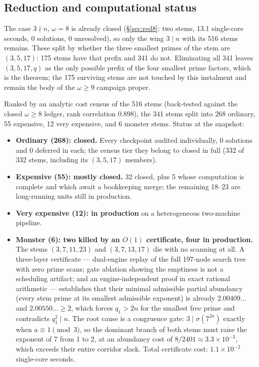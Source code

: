 \documentclass[11pt]{article}
\theoremstyle{remark}
\begin{document}
\subsection{Reduction and computational status}\label{sec:255status}

The case $3 \nmid n$, $\omega = 8$ is already closed (\S\ref{sec:red8}: two stems, 13.1 single-core seconds, 0 solutions, 0 unresolved), so only the wing $3 \mid n$ with its 516 stems remains. These split by whether the three smallest primes of the stem are $(3, 5, 17)$: 175 stems have that prefix and 341 do not. Eliminating all 341 leaves $(3, 5, 17, q)$ as the only possible prefix of the four smallest prime factors, which is the theorem; the 175 surviving stems are not touched by this instalment and remain the body of the $\omega \ge 9$ campaign proper.

Ranked by an analytic cost census of the 516 stems (back-tested against the closed $\omega \ge 8$ ledger, rank correlation 0.898), the 341 stems split into 268 ordinary, 55 expensive, 12 very expensive, and 6 monster stems. Status at the snapshot:

\begin{itemize}
\item \textbf{Ordinary (268): closed.} Every checkpoint audited individually, 0 solutions and 0 deferred in each; the census tier they belong to closed in full (332 of 332 stems, including its $(3,5,17)$ members).
\item \textbf{Expensive (55): mostly closed.} 32 closed, plus 5 whose computation is complete and which await a bookkeeping merge; the remaining 18--23 are long-running units still in production.
\item \textbf{Very expensive (12): in production} on a heterogeneous two-machine pipeline.
\item \textbf{Monster (6): two killed by an $O(1)$ certificate, four in production.} The stems $(3,7,11,23)$ and $(3,7,13,17)$ die with no scanning at all. A three-layer certificate --- dual-engine replay of the full 197-node search tree with zero prime scans; gate ablation showing the emptiness is not a scheduling artifact; and an engine-independent proof in exact rational arithmetic --- establishes that their minimal admissible partial abundancy (every stem prime at its smallest admissible exponent) is already $2.00409\ldots$ and $2.00550\ldots \ge 2$, which forces $q_1 > 2n$ for the smallest free prime and contradicts $q_1^2 \mid n$. The root cause is a congruence gate: $3 \mid \sigma(7^{2a})$ exactly when $a \equiv 1 \pmod 3$, so the dominant branch of both stems must raise the exponent of 7 from 1 to 2, at an abundancy cost of $8/2401 \approx 3.3 \times 10^{-3}$, which exceeds their entire corridor slack. Total certificate cost: $1.1 \times 10^{-2}$ single-core seconds.
\end{itemize}
\end{document}
